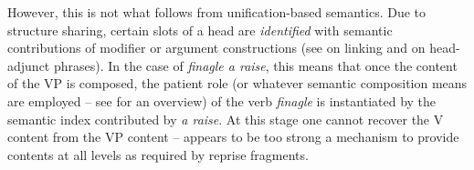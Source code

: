 \documentclass[output=paper
 	        ,biblatex
                ,babelshorthands
                ,newtxmath
                ,draftmode
                ,colorlinks, citecolor=brown
]{langscibook}
\begin{document}
%
However, this is not what follows from unification-based semantics.
%
Due to structure sharing, certain slots of a head are \emph{identified} with semantic contributions of modifier or argument constructions (see   {on linking and  on head-adjunct phrases}).
%
In the case of \textit{finagle a raise}, this means that once the content of the VP is composed, the patient role (or whatever semantic composition means are employed -- see  for an overview) of the verb \textit{finagle} is instantiated by the semantic index contributed by \textit{a raise}.
%
At this stage one cannot recover the V content from the VP content --  appears to be too strong a mechanism to provide contents at all levels as required by reprise fragments. 
\end{document}
